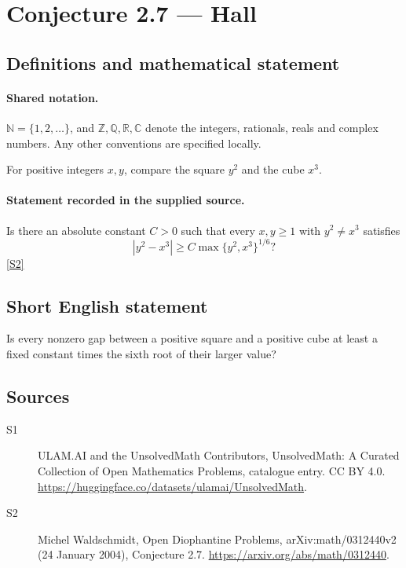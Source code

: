 \documentclass[11pt]{article}
\newcommand{\sref}[2]{\hyperlink{source:#1:#2}{[S#2]}}
\begin{document}
\section{Conjecture 2.7 — Hall}\label{statement}

\subsection{Definitions and mathematical statement}

\paragraph{Shared notation.}$\mathbb N=\{1,2,\ldots\}$, and $\mathbb Z,\mathbb Q,\mathbb R,\mathbb C$ denote the integers, rationals, reals and complex numbers. Any other conventions are specified locally.


For positive integers $x,y$, compare the square $y^2$ and the cube $x^3$.
\paragraph{Statement recorded in the supplied source.}
Is there an absolute constant $C>0$ such that every $x,y\ge1$ with $y^2\ne x^3$ satisfies \[|y^2-x^3|\ge C\max\{y^2,x^3\}^{1/6}?\] \sref{statement}{2}
\subsection{Short English statement}
Is every nonzero gap between a positive square and a positive cube at least a fixed constant times the sixth root of their larger value?
\subsection{Sources}
\begin{description}
\item[\hypertarget{source:statement:1}{S1}] ULAM.AI and the UnsolvedMath Contributors, UnsolvedMath: A Curated Collection of Open Mathematics Problems, catalogue entry. CC BY 4.0. \url{https://huggingface.co/datasets/ulamai/UnsolvedMath}.
\item[\hypertarget{source:statement:2}{S2}] Michel Waldschmidt, Open Diophantine Problems, arXiv:math/0312440v2 (24 January 2004), Conjecture 2.7. \url{https://arxiv.org/abs/math/0312440}.
\end{description}
\label{end:statement}
\end{document}
